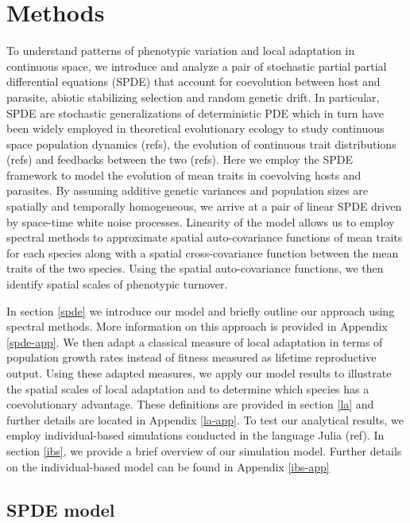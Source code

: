 \documentclass{article}
\begin{document}
\hypertarget{methods}{%
\section{Methods}\label{methods}}

To understand patterns of phenotypic variation and local adaptation in
continuous space, we introduce and analyze a pair of stochastic partial
partial differential equations (SPDE) that account for coevolution
between host and parasite, abiotic stabilizing selection and random
genetic drift. In particular, SPDE are stochastic generalizations of
deterministic PDE which in turn have been widely employed in theoretical
evolutionary ecology to study continuous space population dynamics
(refs), the evolution of continuous trait distributions (refs) and
feedbacks between the two (refs). Here we employ the SPDE framework to
model the evolution of mean traits in coevolving hosts and parasites. By
assuming additive genetic variances and population sizes are spatially
and temporally homogeneous, we arrive at a pair of linear SPDE driven by
space-time white noise processes. Linearity of the model allows us to
employ spectral methods to approximate spatial auto-covariance functions
of mean traits for each species along with a spatial cross-covariance
function between the mean traits of the two species. Using the spatial
auto-covariance functions, we then identify spatial scales of phenotypic
turnover.

In section \ref{spde} we introduce our model and briefly outline our
approach using spectral methods. More information on this approach is
provided in Appendix \ref{spde-app}. We then adapt a classical measure
of local adaptation in terms of population growth rates instead of
fitness measured as lifetime reproductive output. Using these adapted
measures, we apply our model results to illustrate the spatial scales of
local adaptation and to determine which species has a coevolutionary
advantage. These definitions are provided in section \ref{la} and
further details are located in Appendix \ref{la-app}. To test our
analytical results, we employ individual-based simulations conducted in
the language Julia (ref). In section \ref{ibs}, we provide a brief
overview of our simulation model. Further details on the
individual-based model can be found in Appendix \ref{ibs-app}

\hypertarget{spde-model}{%
\subsection{\texorpdfstring{SPDE model
\label{spde}}{SPDE model }}\label{spde-model}}
\end{document}
